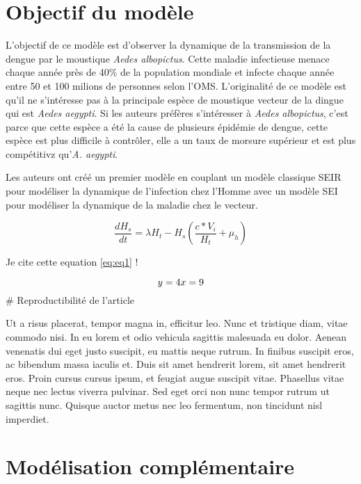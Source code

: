 \hypertarget{objectif-du-moduxe8le}{%
\section{Objectif du modèle}\label{objectif-du-moduxe8le}}

L'objectif de ce modèle est d'observer la dynamique de la transmission
de la dengue par le moustique \emph{Aedes albopictus}. Cette maladie
infectieuse menace chaque année près de 40\% de la population mondiale
et infecte chaque année entre 50 et 100 milions de personnes selon
l'OMS. L'originalité de ce modèle est qu'il ne s'intéresse pas à la
principale espèce de moustique vecteur de la dingue qui est \emph{Aedes
aegypti}. Si les auteurs préfères s'intéresser à \emph{Aedes
albopictus}, c'est parce que cette espèce a été la cause de plusieurs
épidémie de dengue, cette espèce est plus difficile à contrôler, elle a
un taux de morsure supérieur et est plus compétitivz qu'\emph{A.
aegypti}.

Les auteurs ont créé un premier modèle en couplant un modèle classique
SEIR pour modéliser la dynamique de l'infection chez l'Homme avec un
modèle SEI pour modéliser la dynamique de la maladie chez le vecteur.

\begin{equation} \frac{dH_s}{dt} = \lambda H_t - H_s \left(\frac{c*V_i}{H_t} + \mu_h\right)\label{eq:eq1}\end{equation}

Je cite cette equation \ref{eq:eq1} !

\[
y  = 4\\
x  = 9\\
\] \# Reproductibilité de l'article

Ut a risus placerat, tempor magna in, efficitur leo. Nunc et tristique
diam, vitae commodo nisi. In eu lorem et odio vehicula sagittis
malesuada eu dolor. Aenean venenatis dui eget justo suscipit, eu mattis
neque rutrum. In finibus suscipit eros, ac bibendum massa iaculis et.
Duis sit amet hendrerit lorem, sit amet hendrerit eros. Proin cursus
cursus ipsum, et feugiat augue suscipit vitae. Phasellus vitae neque nec
lectus viverra pulvinar. Sed eget orci non nunc tempor rutrum ut
sagittis nunc. Quisque auctor metus nec leo fermentum, non tincidunt
nisl imperdiet.

\hypertarget{moduxe9lisation-compluxe9mentaire}{%
\section{Modélisation
complémentaire}\label{moduxe9lisation-compluxe9mentaire}}

